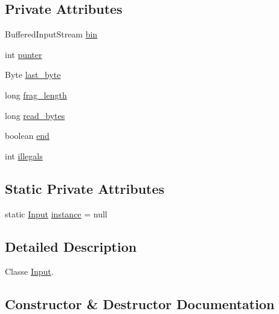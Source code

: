 \subsection*{Private Attributes}
\begin{DoxyCompactItemize}
\item 
Buffered\+Input\+Stream \hyperlink{classpersistencia_1_1input_1_1Input_aa4b622d30a090256ce05c5082cdb0791}{bin}
\item 
int \hyperlink{classpersistencia_1_1input_1_1Input_abe76388d0ac9eeafdba673ad2138f8dc}{punter}
\item 
Byte \hyperlink{classpersistencia_1_1input_1_1Input_a45d4bdcdb96823fc8ffe5c1a430727f2}{last\+\_\+byte}
\item 
long \hyperlink{classpersistencia_1_1input_1_1Input_adae91120899054fe5200d5e307840042}{frag\+\_\+length}
\item 
long \hyperlink{classpersistencia_1_1input_1_1Input_ace2c934234f82fb07ae169b50f71cd32}{read\+\_\+bytes}
\item 
boolean \hyperlink{classpersistencia_1_1input_1_1Input_aa986cd4af0178e1a80f551dcd8936125}{end}
\item 
int \hyperlink{classpersistencia_1_1input_1_1Input_ad3132949d4ac469b5f4d77373389f9f1}{illegals}
\end{DoxyCompactItemize}
\subsection*{Static Private Attributes}
\begin{DoxyCompactItemize}
\item 
static \hyperlink{classpersistencia_1_1input_1_1Input}{Input} \hyperlink{classpersistencia_1_1input_1_1Input_a2e516b1cbef9b704c10fd932b3d11afd}{instance} = null
\end{DoxyCompactItemize}


\subsection{Detailed Description}
Classe \hyperlink{classpersistencia_1_1input_1_1Input}{Input}. 

\subsection{Constructor \& Destructor Documentation}
\mbox{\label{classpersistencia_1_1input_1_1Input_a9b30ef8d489a1fc5b4aa04a14474349a}} 
